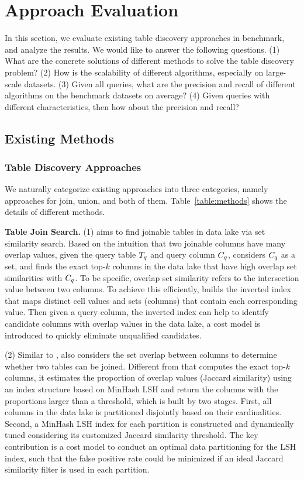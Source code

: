 \section{Approach Evaluation} 
In this section, we  evaluate existing table discovery approaches in \sys benchmark, and analyze the results.
We would like to answer the following questions. 
(1) What are the concrete solutions of different methods to solve the table discovery problem?
(2) How is the scalability of different algorithms, especially on large-scale datasets. 
(3) Given all queries, what are the precision and recall of different algorithms on the benchmark datasets on average?
(4) Given queries with different characteristics, then how about the precision and recall?

\subsection{Existing Methods}




\subsubsection{Table Discovery Approaches}
We naturally categorize existing approaches into three categories, namely approaches for join, union, and both of them.
Table~\ref{table:methods} shows the details of different methods. 

\noindent\textbf{Table Join Search.}
 (1) \josie aims to find joinable tables in data lake via set similarity search. Based on the intuition that two joinable columns have many overlap values, given the query table $T_q$ and query column $C_q$,  \josie considers $C_q$ as a set, and finds the  exact top-$k$ columns in the data lake that have high overlap set similarities with $C_q$. To be specific, overlap set similarity refers to the intersection value between two columns. To achieve this efficiently, \josie builds the inverted index that maps    distinct cell values and sets (columns) that contain each corresponding value. Then given a query column, the inverted index can help to identify candidate columns with overlap values in the data lake, a cost model is introduced to quickly eliminate unqualified candidates. 

 \noindent  (2) Similar to \josie, \lsh also considers the set overlap between columns to determine whether two tables can be joined.  Different from \josie that computes the exact top-$k$ columns, it estimates the proportion of overlap values (\ie Jaccard similarity) using an index structure based on MinHash LSH and return the columns with the proportions larger than a threshold, which is  built by two stages. First, all columns in the data lake is partitioned disjointly based on their cardinalities. Second, a MinHash LSH index for each partition is constructed and dynamically tuned considering its customized Jaccard similarity threshold. The key contribution is a cost model to conduct an optimal data partitioning for the LSH index, such that the false positive rate could be minimized if an ideal Jaccard similarity filter is used in each partition.
 
